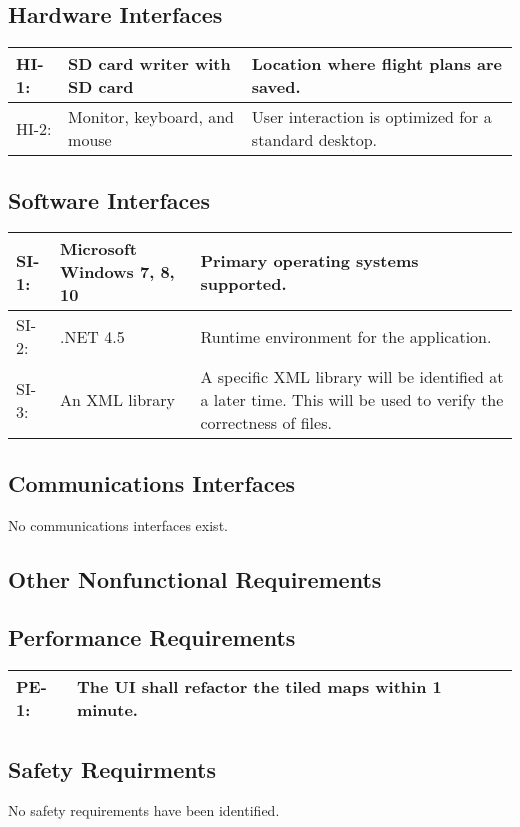 \documentclass[12pt, letterpaper]{article}
\begin{document}
  \subsection{Hardware Interfaces}
    \begin{tabularx}{\textwidth}{|l|l|X|} \hline
      HI-1: & SD card writer with SD card & Location where flight plans are saved. \\ \hline
      HI-2: & Monitor, keyboard, and mouse & User interaction is optimized for a standard desktop. \\ \hline
    \end{tabularx}

  \subsection{Software Interfaces}
    \begin{tabularx}{\textwidth}{|l|l|X|} \hline
      SI-1: & Microsoft Windows 7, 8, 10 & Primary operating systems supported. \\ \hline
      SI-2: & .NET 4.5 & Runtime environment for the application. \\ \hline
      SI-3: & An XML library & A specific XML library will be identified at a later time.
        This will be used to verify the correctness of files. \\ \hline
    \end{tabularx}

  \subsection{Communications Interfaces}
  No communications interfaces exist.

\subsection{Other Nonfunctional Requirements}
  \subsection{Performance Requirements}
    \begin{tabularx}{\textwidth}{|l|X|} \hline
      PE-1: & The UI shall refactor the tiled maps within 1 minute. \\ \hline
    \end{tabularx}

  \subsection{Safety Requirments}
  No safety requirements have been identified.
\end{document}
